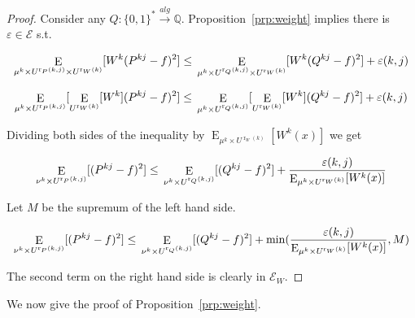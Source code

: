 \documentclass{article}
\numberwithin{equation}{section}
\theoremstyle{definition}
\theoremstyle{plain}
\newcommand{\Words}{{\{ 0, 1 \}^*}}
\DeclareMathOperator{\E}{E}
\DeclareMathOperator{\R}{r}
\newcommand{\Rats}{\mathbb{Q}}
\begin{document}
\begin{proof}

Consider any $Q: \Words \xrightarrow{alg} \Rats$. Proposition~\ref{prp:weight} implies there is $\varepsilon \in \mathcal{E}$ s.t.

$$\E_{\mu^k \times U^{\R_P(k,j)} \times U^{\R_W(k)}}[W^k(P^{kj} - f)^2] \leq \\ \E_{\mu^k \times U^{\R_Q(k,j)} \times U^{\R_W(k)}}[W^k(Q^{kj} - f)^2] + \varepsilon(k,j)$$

$$\E_{\mu^k \times U^{\R_P(k,j)}}[\E_{U^{\R_W(k)}}[W^k](P^{kj} - f)^2] \leq \\ \E_{\mu^k \times U^{\R_Q(k,j)}}[\E_{U^{\R_W(k)}}[W^k](Q^{kj} - f)^2] + \varepsilon(k,j)$$

Dividing both sides of the inequality by $\E_{\mu^k \times U^{\R_W(k)}}[W^k(x)]$ we get

$$\E_{\nu^k \times U^{\R_P(k,j)}}[(P^{kj} - f)^2] \leq \\ \E_{\nu^k \times U^{\R_Q(k,j)}}[(Q^{kj} - f)^2] + \frac{\varepsilon(k,j)}{\E_{\mu^k \times U^{\R_W(k)}}[W^k(x)]}$$

Let $M$ be the supremum of the left hand side.

$$\E_{\nu^k \times U^{\R_P(k,j)}}[(P^{kj} - f)^2] \leq \\ \E_{\nu^k \times U^{\R_Q(k,j)}}[(Q^{kj} - f)^2] + \min(\frac{\varepsilon(k,j)}{\E_{\mu^k \times U^{\R_W(k)}}[W^k(x)]},M)$$

The second term on the right hand side is clearly in $\mathcal{E}_W$.

\end{proof}

We now give the proof of Proposition~\ref{prp:weight}.
\end{document}
